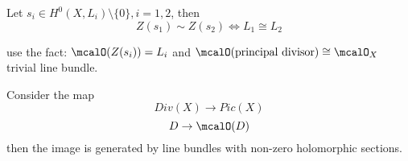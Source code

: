 \begin{cor}
Let $s_i\in H^0(X,L_i)\setminus\{0\},i=1,2$, then
$$Z(s_1)\sim Z(s_2)\iff L_1\cong L_2$$
\end{cor}
use the fact: $\mcalO(Z(s_i))=L_i$ and $\mcalO(\text{principal divisor})\cong\mcalO_X$
trivial line bundle.

\begin{prop}
Consider the map 
$$Div(X)\to Pic(X)$$
$$D\to\mcalO(D)$$
then the image is generated by line bundles with non-zero holomorphic sections.
\end{prop}




